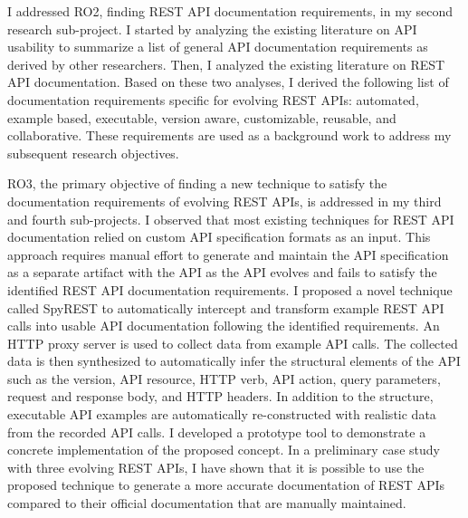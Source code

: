 \documentclass[12pt]{ucalgthes1}
\begin{document}
I addressed RO2, finding REST API documentation requirements, in my second research sub-project. I started by analyzing the existing literature on API usability to summarize a list of general API documentation requirements as derived by other researchers. Then, I analyzed the existing literature on REST API documentation. Based on these two analyses, I derived the following list of documentation requirements specific for evolving REST APIs: automated, example based, executable, version aware, customizable, reusable, and collaborative. These requirements are used as a background work to address my subsequent research objectives.

RO3, the primary objective of finding a new technique to satisfy the documentation requirements of evolving REST APIs, is addressed in my third and fourth sub-projects. I observed that most existing techniques for REST API documentation relied on custom API specification formats as an input. This approach requires manual effort to generate and maintain the API specification as a separate artifact with the API as the API evolves and fails to satisfy the identified REST API documentation requirements. I proposed a novel technique called SpyREST to automatically intercept and transform example REST API calls into usable API documentation following the identified requirements. An HTTP proxy server is used to collect data from example API calls. The collected data is then synthesized to automatically infer the structural elements of the API such as the version, API resource, HTTP verb, API action, query parameters, request and response body, and HTTP headers. In addition to the structure, executable API examples are automatically re-constructed with realistic data from the recorded API calls. I developed a prototype tool to demonstrate a concrete implementation of the proposed concept. In a preliminary case study with three evolving REST APIs, I have shown that it is possible to use the proposed technique to generate a more accurate documentation of REST APIs compared to their official documentation that are  manually maintained.
\end{document}
